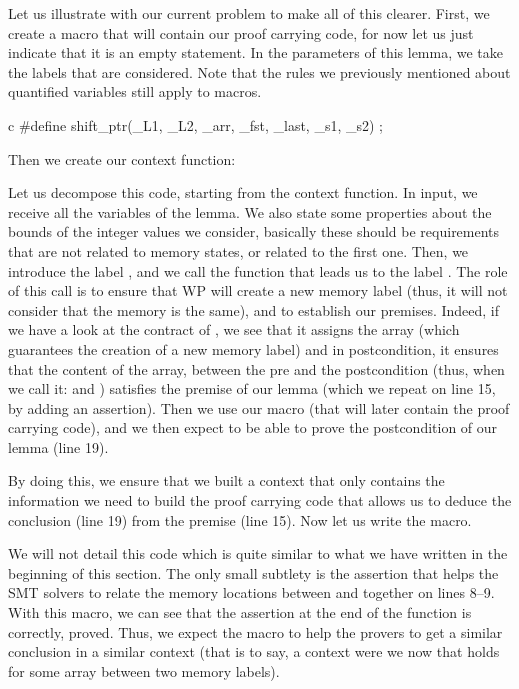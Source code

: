 Let us illustrate with our current problem to make all of this clearer. First,
we create a macro  that will contain our proof carrying
code, for now let us just indicate that it is an empty statement. In the
parameters of this lemma, we take the labels that are considered. Note that the
rules we previously mentioned about quantified variables still apply to macros.


\begin{CodeBlock}{c}
#define shift_ptr(_L1, _L2, _arr, _fst, _last, _s1, _s2) ;
\end{CodeBlock}


Then we create our context function:




Let us decompose this code, starting from the context function. In input, we
receive all the variables of the lemma. We also state some properties about the
bounds of the integer values we consider, basically these should be requirements
that are not related to memory states, or related to the first one. Then, we
introduce the label ,
and we call the function  that leads
us to the label . The role of this call is to ensure that WP will
create a new memory label (thus, it will not consider that the memory is the
same), and to establish our premises. Indeed, if we have a look at the contract
of , we see that it assigns the array (which
guarantees the creation of a new memory label) and in postcondition, it ensures
that the content of the array, between the pre and the postcondition (thus, when
we call it:  and ) satisfies the premise of our
lemma (which we repeat on line 15, by adding an assertion). Then we use our
 macro (that will later contain the proof carrying code),
and we then expect to be able to prove the postcondition of our lemma (line 19).



By doing this, we ensure that we built a context that only contains the
information we need to build the proof carrying code that allows us to deduce
the conclusion (line 19) from the premise (line 15). Now let us write the macro.






We will not detail this code which is quite similar to what we have written in
the beginning of this section. The only small subtlety is the assertion that
helps the SMT solvers to relate the memory locations between  and
 together on lines 8--9. With this macro, we can see that the
assertion at the end of the function 
is correctly, proved. Thus, we expect the macro to help the provers to get a
similar conclusion in a similar context (that is to say, a context were we now
that  holds for some array between two memory labels).


